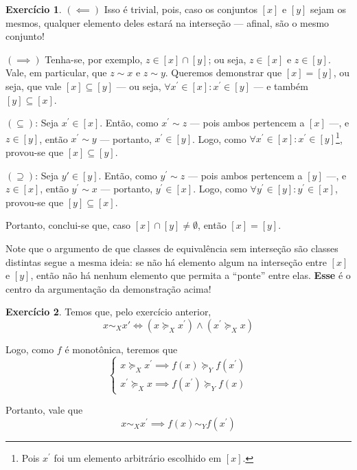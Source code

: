 \documentclass[12pt]{article}
\numberwithin{equation}{section}
\theoremstyle{plain}
\theoremstyle{definition}
\newtheorem{exercise}{Exercício}
\theoremstyle{remark}
\newcommand{\pref}{\succeq}
\begin{document}
\begin{exercise}
  $(\impliedby)$ Isso é trivial, pois, caso os conjuntos $[x]$ e $[y]$ sejam os mesmos, qualquer elemento deles estará na interseção --- afinal, são o mesmo conjunto!

  $(\implies)$ Tenha-se, por exemplo, $z \in [x] \cap [y]$; ou seja, $z \in [x]$ e $z \in [y]$. Vale, em particular, que $z \sim x$ e $z \sim y$. Queremos demonstrar que $[x] = [y]$, ou seja, que vale $[x] \subseteq [y]$ --- ou seja, $\forall x^{\prime} \in [x]: x^{\prime} \in [y]$ --- e também $[y] \subseteq [x]$. 

  $(\subseteq)$: Seja $x^{\prime} \in [x]$. Então, como $x^{\prime} \sim z$ --- pois ambos pertencem a $[x]$ ---, e $z \in [y]$, então $x^{\prime} \sim y$ --- portanto, $x^{\prime}  \in [y]$. Logo, como $\forall x^{\prime} \in [x]: x^{\prime} \in [y]$\footnote{Pois $x^{\prime}$ foi um elemento arbitrário escolhido em $[x]$.}, provou-se que $[x] \subseteq [y]$.
  
  $(\supseteq)$: Seja $y{\prime} \in [y]$. Então, como $y^{\prime} \sim z$ --- pois ambos pertencem a $[y]$ ---, e $z \in [x]$, então $y^{\prime} \sim x$ --- portanto, $y^{\prime} \in [x]$. Logo, como $\forall y^{\prime} \in [y]: y^{\prime} \in [x]$, provou-se que $[y] \subseteq [x]$.
  
  Portanto, conclui-se que, caso $[x] \cap [y] \neq \emptyset$, então $[x] = [y]$.

  Note que o argumento de que classes de equivalência sem interseção são classes distintas segue a mesma ideia: se não há elemento algum na interseção entre $[x]$ e $[y]$, então não há nenhum elemento que permita a ``ponte'' entre elas. \textbf{Esse} é o centro da argumentação da demonstração acima!  
\end{exercise}

\begin{exercise}
  Temos que, pelo exercício anterior,
  \[
  x \sim_X x' \iff (x \pref_X x^{\prime})  \land (x^{\prime} \pref_X x)
  \]
  
  Logo, como $f$ é monotônica, teremos que 
  \[
  \begin{cases}
  x  \succeq_{X} x^{\prime}  \implies f(x) \succeq_{Y} f(x^{\prime} ) \\
  x^{\prime} \succeq_X x \implies f(x^{\prime} ) \succeq_Y f(x)
  \end{cases}
  \]

  Portanto, vale que 
  \[
  x \sim_X x^{\prime}  \implies f(x) \sim_Y f(x^{\prime} )
  \]
\end{exercise}
\end{document}
